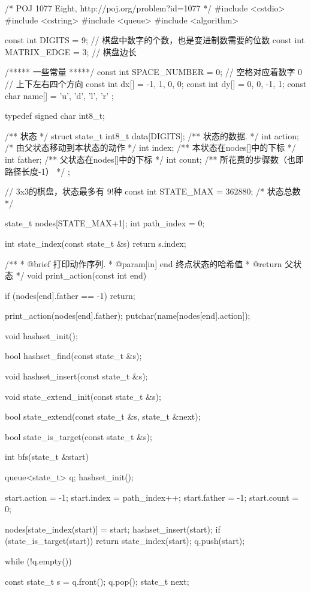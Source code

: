 \begin{Codex}[label=eight_digits_bfs2.c]
/* POJ 1077 Eight, http://poj.org/problem?id=1077 */
#include <cstdio>
#include <cstring>
#include <queue>
#include <algorithm>

const int DIGITS = 9; // 棋盘中数字的个数，也是变进制数需要的位数
const int MATRIX_EDGE = 3;       // 棋盘边长

/***** 一些常量 *****/
const int SPACE_NUMBER = 0; // 空格对应着数字 0
// 上下左右四个方向
const int dx[] = {-1, 1, 0, 0};
const int dy[] = {0, 0, -1, 1};
const char name[] = { 'u', 'd', 'l', 'r' };

typedef signed char int8_t;

/** 状态 */
struct state_t {
    int8_t data[DIGITS];  /** 状态的数据. */
    int action; /* 由父状态移动到本状态的动作 */
    int index;  /** 本状态在nodes[]中的下标 */
    int father; /** 父状态在nodes[]中的下标 */
    int count;  /** 所花费的步骤数（也即路径长度-1） */
};

// 3x3的棋盘，状态最多有 9!种
const int STATE_MAX = 362880;  /* 状态总数 */

state_t nodes[STATE_MAX+1];
int path_index = 0;

int state_index(const state_t &s) {
    return s.index;
}

/**
 * @brief 打印动作序列.
 * @param[in] end 终点状态的哈希值
 * @return 父状态
 */
void print_action(const int end) {
    if (nodes[end].father == -1) return;

    print_action(nodes[end].father);
    putchar(name[nodes[end].action]);
}

void hashset_init();

bool hashset_find(const state_t &s);

void hashset_insert(const state_t &s);

void state_extend_init(const state_t &s);

bool state_extend(const state_t &s, state_t &next);

bool state_is_target(const state_t &s);

int bfs(state_t &start) {
    queue<state_t> q;
    hashset_init();

    start.action = -1;
    start.index = path_index++;
    start.father = -1;
    start.count = 0;

    nodes[state_index(start)] = start;
    hashset_insert(start);
    if (state_is_target(start))
        return state_index(start);
    q.push(start);

    while (!q.empty()) {
        const state_t s = q.front(); q.pop();
        state_t next;

}}
\end{Codex}
